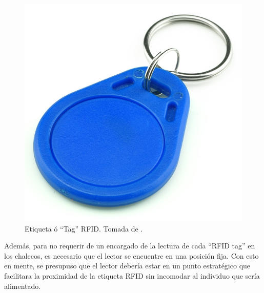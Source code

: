 	\begin{figure}[H]
	\begin{center}
		\includegraphics[scale=0.25]{img/rfidtag.png}
	\end{center}
	\caption{Etiqueta ó ``Tag'' RFID. Tomada de \cite{googlepics}. \label{rfidtagpng}}
	\end{figure}


		
Además, para no requerir de un encargado de la lectura de cada ``RFID tag'' en los chalecos, es necesario que el lector se encuentre en una posición fija. Con esto en mente, se presupuso que el lector debería estar en un punto estratégico que facilitara la proximidad de la etiqueta RFID sin incomodar al individuo que sería alimentado.\\

